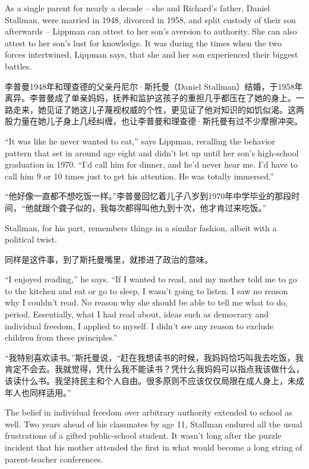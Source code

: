 \ifdefined\eng
As a single parent for nearly a decade -- she and Richard's father, Daniel Stallman, were married in 1948, divorced in 1958, and split custody of their son afterwards -- Lippman can attest to her son's aversion to authority. She can also attest to her son's lust for knowledge. It was during the times when the two forces intertwined, Lippman says, that she and her son experienced their biggest battles.
\fi

\ifdefined\chs
李普曼1948年和理查德的父亲丹尼尔·斯托曼（Daniel Stallman）结婚，于1958年离异。李普曼成了单亲妈妈，抚养和监护这孩子的重担几乎都压在了她的身上。一路走来，她见证了她这儿子蔑视权威的个性，更见证了他对知识的如饥似渴。这两股力量在她儿子身上几经纠缠，也让李普曼和理查德·斯托曼有过不少摩擦冲突。
\fi

\ifdefined\eng
``It was like he never wanted to eat,'' says Lippman, recalling the behavior pattern that set in around age eight and didn't let up until her son's high-school graduation in 1970. ``I'd call him for dinner, and he'd never hear me. I'd have to call him 9 or 10 times just to get his attention. He was totally immersed.''
\fi

\ifdefined\chs
``他好像一直都不想吃饭一样。''李普曼回忆着儿子八岁到1970年中学毕业的那段时间，``他就跟个聋子似的，我每次都得叫他九到十次，他才肯过来吃饭。''
\fi

\ifdefined\eng
Stallman, for his part, remembers things in a similar fashion, albeit with a political twist.
\fi

\ifdefined\chs
同样是这件事，到了斯托曼嘴里，就掺进了政治的意味。
\fi

\ifdefined\eng
``I enjoyed reading,'' he says. ``If I wanted to read, and my mother told me to go to the kitchen and eat or go to sleep, I wasn't going to listen. I saw no reason why I couldn't read. No reason why she should be able to tell me what to do, period. Essentially, what I had read about, ideas such as democracy and individual freedom, I applied to myself. I didn't see any reason to exclude children from these principles.''
\fi

\ifdefined\chs
``我特别喜欢读书。''斯托曼说，``赶在我想读书的时候，我妈妈恰巧叫我去吃饭，我肯定不会去。我就觉得，凭什么我不能读书？凭什么我妈妈可以指点我该做什么，该读什么书。我坚持民主和个人自由。很多原则不应该仅仅局限在成人身上，未成年人也同样适用。''
\fi

\ifdefined\eng
The belief in individual freedom over arbitrary authority extended to school as well. Two years ahead of his classmates by age 11, Stallman endured all the usual frustrations of a gifted public-school student. It wasn't long after the puzzle incident that his mother attended the first in what would become a long string of parent-teacher conferences.
\fi

